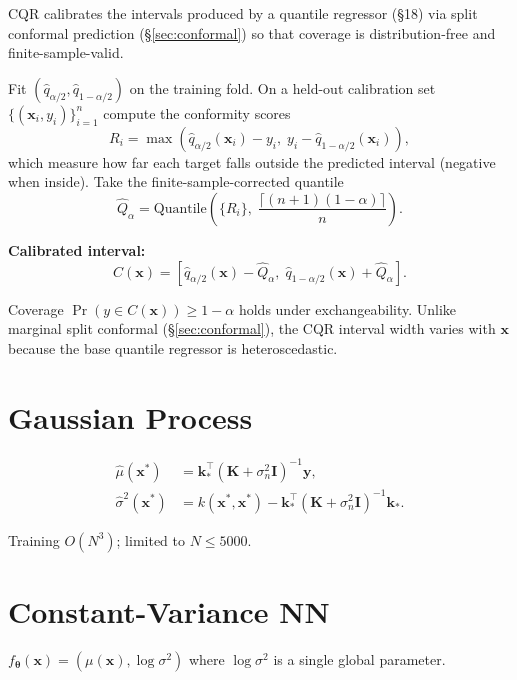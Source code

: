 \documentclass[11pt,a4paper]{article}
\theoremstyle{definition}
\newcommand{\bx}{\mathbf{x}}
\newcommand{\by}{\mathbf{y}}
\newcommand{\bK}{\mathbf{K}}
\newcommand{\bI}{\mathbf{I}}
\newcommand{\btheta}{\boldsymbol{\theta}}
\begin{document}
CQR calibrates the intervals produced by a quantile regressor (§18) via
split conformal prediction (§\ref{sec:conformal}) so that coverage is
distribution-free and finite-sample-valid.

Fit $(\hat{q}_{\alpha/2}, \hat{q}_{1-\alpha/2})$ on the training fold.
On a held-out calibration set $\{(\bx_i, y_i)\}_{i=1}^{n}$ compute the
conformity scores
\begin{equation}
  R_i = \max\!\left(\hat{q}_{\alpha/2}(\bx_i) - y_i,\; y_i - \hat{q}_{1-\alpha/2}(\bx_i)\right),
  \label{eq:cqr_score}
\end{equation}
which measure how far each target falls outside the predicted interval
(negative when inside). Take the finite-sample-corrected quantile
\[
  \hat{Q}_\alpha = \text{Quantile}\!\left(\{R_i\}, \; \frac{\lceil (n+1)(1-\alpha) \rceil}{n}\right).
\]

\textbf{Calibrated interval:}
\[
  C(\bx) = \left[\hat{q}_{\alpha/2}(\bx) - \hat{Q}_\alpha,\; \hat{q}_{1-\alpha/2}(\bx) + \hat{Q}_\alpha\right].
\]

Coverage $\Pr(y \in C(\bx)) \geq 1 - \alpha$ holds under exchangeability.
Unlike marginal split conformal (§\ref{sec:conformal}), the CQR interval
width varies with $\bx$ because the base quantile regressor is
heteroscedastic.

\section{Gaussian Process}

\begin{align}
  \hat{\mu}(\bx^*) &= \mathbf{k}_*^\top (\bK + \sigma_n^2 \bI)^{-1} \by, \\
  \hat{\sigma}^2(\bx^*) &= k(\bx^*, \bx^*) - \mathbf{k}_*^\top (\bK + \sigma_n^2 \bI)^{-1} \mathbf{k}_*.
\end{align}

Training $O(N^3)$; limited to $N \leq 5000$.

\section{Constant-Variance NN}

$f_\btheta(\bx) = (\mu(\bx), \log\sigma^2)$ where $\log\sigma^2$ is a
single global parameter.
\end{document}

